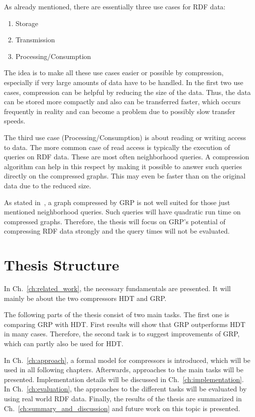 As already mentioned, there are essentially three use cases for RDF data:

\begin{enumerate}
	\item Storage
	\item Transmission
	\item Processing/Consumption
\end{enumerate}

The idea is to make all these use cases easier or possible by compression, especially if very large amounts of data have to be handled. In the first two use cases, compression can be helpful by reducing the size of the data. Thus, the data can be stored more compactly and also can be transferred faster, which occurs frequently in reality and can become a problem due to possibly slow transfer speeds.

The third use case (Processing/Consumption) is about reading or writing access to data. The more common case of read access is typically the execution of queries on RDF data. These are most often neighborhood queries. A compression algorithm can help in this respect by making it possible to answer such queries directly on the compressed graphs. This may even be faster than on the original data due to the reduced size.

As stated in~\cite{maneth}, a graph compressed by GRP is not well suited for those just mentioned neighborhood queries. Such queries will have quadratic run time on compressed graphs. Therefore, the thesis will focus on GRP's potential of compressing RDF data strongly and the query times will not be evaluated.



\section{Thesis Structure}

In Ch.~\ref{ch:related_work}, the necessary fundamentals are presented. It will mainly be about the two compressors HDT and GRP. 

The following parts of the thesis consist of two main tasks. The first one is comparing GRP with HDT. First results will show that GRP outperforms HDT in many cases. Therefore, the second task is to suggest improvements of GRP, which can partly also be used for HDT.

In Ch.~\ref{ch:approach}, a formal model for compressors is introduced, which will be used in all following chapters. Afterwards, approaches to the main tasks will be presented. Implementation details will be discussed in Ch.~\ref{ch:implementation}. In Ch.~\ref{ch:evaluation}, the approaches to the different tasks will be evaluated by using real world RDF data. Finally, the results of the thesis are summarized in Ch.~\ref{ch:summary_and_discussion} and future work on this topic is presented.








